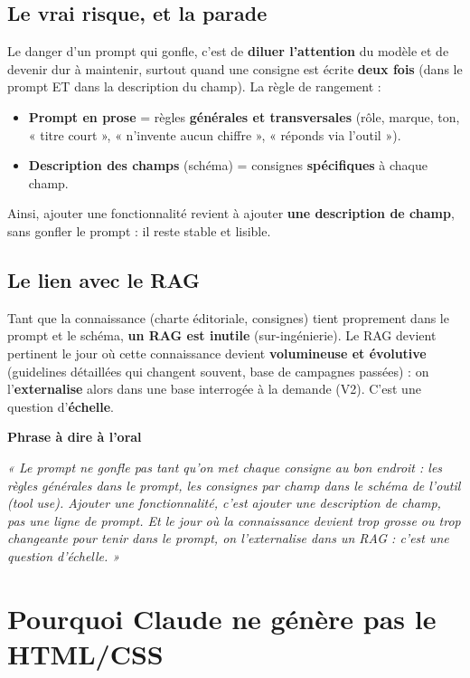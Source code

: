 \documentclass[11pt,a4paper]{article}
\newcommand{\phrasea}[1]{%
  \begin{phrasebox}
  {\bfseries\color{gefblue}\textsf{Phrase à dire à l'oral}}\par\smallskip
  \itshape #1
  \end{phrasebox}%
}
\begin{document}
\subsection{Le vrai risque, et la parade}
Le danger d'un prompt qui gonfle, c'est de \textbf{diluer l'attention} du modèle et de
devenir dur à maintenir, surtout quand une consigne est écrite \textbf{deux fois} (dans
le prompt ET dans la description du champ). La règle de rangement :
\begin{itemize}[leftmargin=1.4em]
  \item \textbf{Prompt en prose} = règles \textbf{générales et transversales} (rôle,
        marque, ton, « titre court », « n'invente aucun chiffre », « réponds via l'outil »).
  \item \textbf{Description des champs} (schéma) = consignes \textbf{spécifiques} à
        chaque champ.
\end{itemize}
Ainsi, ajouter une fonctionnalité revient à ajouter \textbf{une description de champ},
sans gonfler le prompt : il reste stable et lisible.

\subsection{Le lien avec le RAG}
Tant que la connaissance (charte éditoriale, consignes) tient proprement dans le prompt
et le schéma, \textbf{un RAG est inutile} (sur-ingénierie). Le RAG devient pertinent le
jour où cette connaissance devient \textbf{volumineuse et évolutive} (guidelines
détaillées qui changent souvent, base de campagnes passées) : on l'\textbf{externalise}
alors dans une base interrogée à la demande (V2). C'est une question d'\textbf{échelle}.

\phrasea{« Le prompt ne gonfle pas tant qu'on met chaque consigne au bon endroit : les
règles générales dans le prompt, les consignes par champ dans le schéma de l'outil
(tool use). Ajouter une fonctionnalité, c'est ajouter une description de champ, pas une
ligne de prompt. Et le jour où la connaissance devient trop grosse ou trop changeante
pour tenir dans le prompt, on l'externalise dans un RAG : c'est une question d'échelle. »}

\section{Pourquoi Claude ne génère pas le HTML/CSS}
\end{document}
